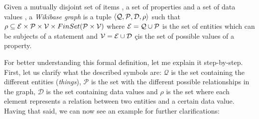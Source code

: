 \begin{definition}
    Given a mutually disjoint set of items \ItemSet{}, a set of properties \PropSet{} and a set of data values \DataValueSet{}, a \emph{Wikibase graph} is a tuple $\langle\mathcal{Q},\mathcal{P},\mathcal{D},\rho\rangle$ such that $\rho\subseteq\mathcal{E}\times\mathcal{P}\times\mathcal{V}\times FinSet(\mathcal{P}\times\mathcal{V})$ where $\mathcal{E}=\mathcal{Q}\cup\mathcal{P}$ is the set of entities which can be subjects of a statement and $\mathcal{V}=\mathcal{E}\cup\mathcal{D}$ çis the set of possible values of a property.
\end{definition}

For better understanding this formal definition, let me explain it step-by-step. First, let us clarify what the described symbols are: $\mathcal{Q}$ is the set containing the different entities (\textit{things}), $\mathcal{P}$ is the set with the different possible relationships in the graph, $\mathcal{D}$ is the set containing data values and $\rho$ is the set where each element represents a relation between two entities and a certain data value. Having that said, we can now see an example for further clarifications:

